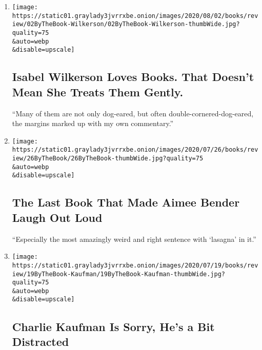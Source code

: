 \begin{enumerate}
\def\labelenumi{\arabic{enumi}.}
\item
  \href{/2020/07/30/books/review/isabel-wilkerson-by-the-book-interview.html}{}

  \texttt{[image: https://static01.graylady3jvrrxbe.onion/images/2020/08/02/books/review/02ByTheBook-Wilkerson/02ByTheBook-Wilkerson-thumbWide.jpg?quality=75\\\&auto=webp\\\&disable=upscale]}

  \hypertarget{isabel-wilkerson-loves-books-that-doesnt-mean-she-treats-them-gently}{%
  \subsection{Isabel Wilkerson Loves Books. That Doesn't Mean She Treats
  Them
  Gently.}\label{isabel-wilkerson-loves-books-that-doesnt-mean-she-treats-them-gently}}

  ``Many of them are not only dog-eared, but often
  double-cornered-dog-eared, the margins marked up with my own
  commentary.''
\item
  \href{/2020/07/23/books/review/aimee-bender-by-the-book-interview.html}{}

  \texttt{[image: https://static01.graylady3jvrrxbe.onion/images/2020/07/26/books/review/26ByTheBook/26ByTheBook-thumbWide.jpg?quality=75\\\&auto=webp\\\&disable=upscale]}

  \hypertarget{the-last-book-that-made-aimee-bender-laugh-out-loud}{%
  \subsection{The Last Book That Made Aimee Bender Laugh Out
  Loud}\label{the-last-book-that-made-aimee-bender-laugh-out-loud}}

  ``Especially the most amazingly weird and right sentence with
  `lasagna' in it.''
\item
  \href{/2020/07/16/books/review/charlie-kaufman-by-the-book-interview.html}{}

  \texttt{[image: https://static01.graylady3jvrrxbe.onion/images/2020/07/19/books/review/19ByTheBook-Kaufman/19ByTheBook-Kaufman-thumbWide.jpg?quality=75\\\&auto=webp\\\&disable=upscale]}

  \hypertarget{charlie-kaufman-is-sorry-hes-a-bit-distracted}{%
  \subsection{Charlie Kaufman Is Sorry, He's a Bit
  Distracted}\label{charlie-kaufman-is-sorry-hes-a-bit-distracted}}


\end{enumerate}
